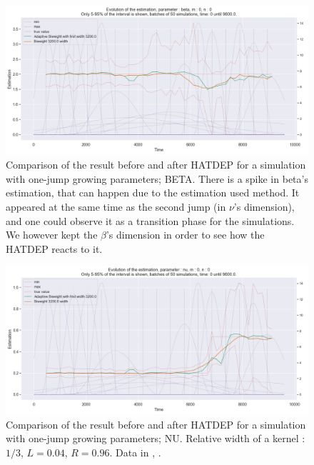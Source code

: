 \begin{figure}
\centering
\includegraphics[width = 0.90 \textwidth]{../imag/chap3/2/2.png}
\caption{Comparison of the result before and after HATDEP for a simulation with one-jump growing parameters; BETA. There is a spike in beta's estimation, that can happen due to the estimation used method. It appeared at the same time as the second jump (in $\nu$'s dimension), and one could observe it as a transition phase for the simulations. We however kept the $\beta$'s dimension in order to see how the HATDEP reacts to it.}
\label{fig:first_estimate_2_beta}
\end{figure}

\begin{figure}
\centering
\includegraphics[width = 0.90 \textwidth]{../imag/chap3/2/3.png}
\caption{Comparison of the result before and after HATDEP for a simulation with one-jump growing parameters; NU. Relative width of a kernel : $1/3$, $L = 0.04$, $R = 0.96$.  Data in \protect {}, \protect {}.}
\label{fig:first_estimate_2_nu}
\end{figure}



















